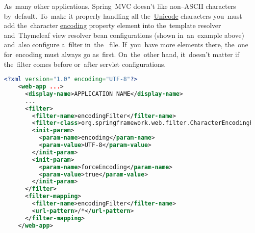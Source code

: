As~many other applications, Spring~MVC doesn't like non--ASCII characters by~default.
To~make it properly handling all the~\hyperref[charactersetencoding]{Unicode} characters you~must add the~character \hyperref[utf]{encoding} property element into the~template resolver and~Thymeleaf view resolver bean configurations (shown in~an~example above) and~also configure a~filter in~the~ file.
If~you~have more  elements there, the~one for~encoding must always go as~first.
On~the~other hand, it~doesn't matter if the~filter comes before or~after servlet configurations.

\begin{lstlisting}[language=XML, title=Example of a~\textit{web.xml} file with encoding filter configuration]
    <?xml version="1.0" encoding="UTF-8"?>
    <web-app ...>
      <display-name>APPLICATION NAME</display-name>
      ...
      <filter>
        <filter-name>encodingFilter</filter-name>
        <filter-class>org.springframework.web.filter.CharacterEncodingFilter </filter-class>
        <init-param>
          <param-name>encoding</param-name>
          <param-value>UTF-8</param-value>
        </init-param>
        <init-param>
          <param-name>forceEncoding</param-name>
          <param-value>true</param-value>
        </init-param>
      </filter>
      <filter-mapping>
        <filter-name>encodingFilter</filter-name>
        <url-pattern>/*</url-pattern>
      </filter-mapping>
    </web-app>
\end{lstlisting}
\newpage
